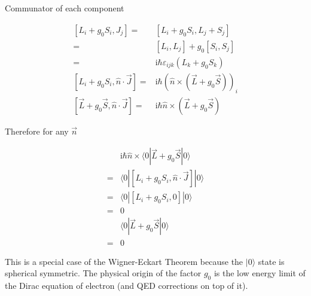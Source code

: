 \documentclass[10pt,fleqn]{article}
\newcommand{\ui}{\mathrm{i}}
\newcommand{\eqar}[1]
{
  \begin{align*}
    #1
  \end{align*}
}
\newcommand{\paren}[1]{{\left({#1}\right)}}
\newcommand{\sqr}[1]{{\left[{#1}\right]}}
\begin{document}
\section{}
\subsection{}
Communator of each component
\eqar{
  \sqr{L_i+g_0S_i,J_j}=&\sqr{L_i+g_0S_i,L_j+S_j}\\
  =&\sqr{L_i,L_j}+g_0\sqr{S_i,S_j}\\
  =&\ui\hbar\varepsilon_{ijk}\paren{L_k+g_0S_k}\\
  \sqr{L_i+g_0S_i,\hat n\cdot\vec J}=&\ui\hbar \paren{\hat n\times\paren{\vec L+g_0\vec S}}_i\\
  \sqr{\vec L+g_0\vec S,\hat n\cdot\vec J}=&\ui\hbar\hat n\times\paren{\vec L+g_0\vec S}
}
Therefore for any $\vec n$
\eqar{
  &\ui\hbar\hat n\times\langle 0|\vec L+g_0\vec S|0\rangle\\
  =&\langle 0|\sqr{L_i+g_0S_i,\hat n\cdot\vec J}|0\rangle\\
  =&\langle 0|\sqr{L_i+g_0S_i,0}|0\rangle\\
  =&0\\
  &\langle 0|\vec L+g_0\vec S|0\rangle\\
  =&0
}
This is a special case of the Wigner-Eckart Theorem because the $|0\rangle$ state
is spherical symmetric. The physical origin of the factor $g_0$ is the low energy
limit of the Dirac equation of electron (and QED corrections on top of it).
\end{document}
